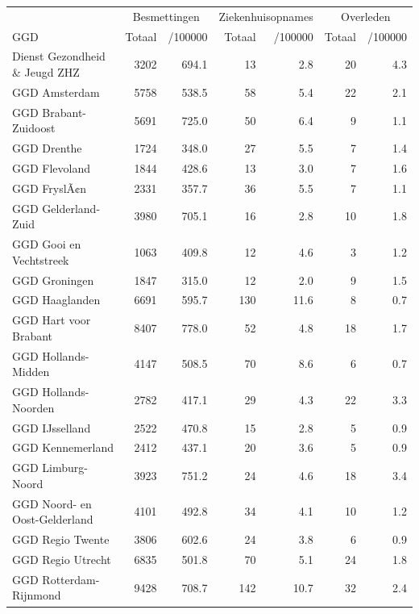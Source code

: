 \documentclass[
  english,
  man,floatsintext]{apa6}
\begin{document}
\begin{table}
\centering\begingroup\fontsize{10}{12}\selectfont

\begin{threeparttable}
\begin{tabular}{lrrrrrr}
\toprule
\multicolumn{1}{c}{ } & \multicolumn{2}{c}{Besmettingen} & \multicolumn{2}{c}{Ziekenhuisopnames} & \multicolumn{2}{c}{Overleden} \\
\cmidrule(l{3pt}r{3pt}){2-3} \cmidrule(l{3pt}r{3pt}){4-5} \cmidrule(l{3pt}r{3pt}){6-7}
GGD & Totaal & /100000 & Totaal & /100000 & Totaal & /100000\\
\midrule
Dienst Gezondheid \& Jeugd ZHZ & 3202 & 694.1 & 13 & 2.8 & 20 & 4.3\\
GGD Amsterdam & 5758 & 538.5 & 58 & 5.4 & 22 & 2.1\\
GGD Brabant-Zuidoost & 5691 & 725.0 & 50 & 6.4 & 9 & 1.1\\
GGD Drenthe & 1724 & 348.0 & 27 & 5.5 & 7 & 1.4\\
GGD Flevoland & 1844 & 428.6 & 13 & 3.0 & 7 & 1.6\\
GGD FryslÃ¢n & 2331 & 357.7 & 36 & 5.5 & 7 & 1.1\\
GGD Gelderland-Zuid & 3980 & 705.1 & 16 & 2.8 & 10 & 1.8\\
GGD Gooi en Vechtstreek & 1063 & 409.8 & 12 & 4.6 & 3 & 1.2\\
GGD Groningen & 1847 & 315.0 & 12 & 2.0 & 9 & 1.5\\
GGD Haaglanden & 6691 & 595.7 & 130 & 11.6 & 8 & 0.7\\
GGD Hart voor Brabant & 8407 & 778.0 & 52 & 4.8 & 18 & 1.7\\
GGD Hollands-Midden & 4147 & 508.5 & 70 & 8.6 & 6 & 0.7\\
GGD Hollands-Noorden & 2782 & 417.1 & 29 & 4.3 & 22 & 3.3\\
GGD IJsselland & 2522 & 470.8 & 15 & 2.8 & 5 & 0.9\\
GGD Kennemerland & 2412 & 437.1 & 20 & 3.6 & 5 & 0.9\\
GGD Limburg-Noord & 3923 & 751.2 & 24 & 4.6 & 18 & 3.4\\
GGD Noord- en Oost-Gelderland & 4101 & 492.8 & 34 & 4.1 & 10 & 1.2\\
GGD Regio Twente & 3806 & 602.6 & 24 & 3.8 & 6 & 0.9\\
GGD Regio Utrecht & 6835 & 501.8 & 70 & 5.1 & 24 & 1.8\\
GGD Rotterdam-Rijnmond & 9428 & 708.7 & 142 & 10.7 & 32 & 2.4\\

\end{tabular}
\end{threeparttable}
\end{table}
\end{document}
